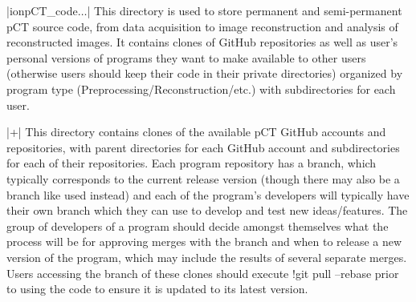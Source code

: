 \begin{tcbenvironment}
\begin{tcbparbox}|\dirsep ion\dirsep pCT\_code\dirsep $\dots$|
\bfdash This directory is used to store permanent and semi-permanent pCT source code, from data acquisition to image reconstruction and analysis of reconstructed images.  It contains clones of GitHub repositories as well as user's personal versions of programs they want to make available to other users (otherwise users should keep their code in their private directories) organized by program type (Preprocessing/Reconstruction/etc.) with subdirectories for each user.
\end{tcbparbox}
\begin{tcbparbox}|+|
\bfdash This directory contains clones of the available pCT GitHub accounts and repositories, with parent directories for each GitHub account and subdirectories for each of their repositories.  Each program repository has a  branch, which typically corresponds to the current release version (though there may also be a branch like  used instead) and each of the program's developers will typically have their own branch which they can use to develop and test new ideas/features.  The group of developers of a program should decide amongst themselves what the process will be for approving merges with the  branch and when to release a new version of the program, which may include the results of several separate merges.  Users accessing the  branch of these clones should execute \tcbinlinebashbox!{git pull --rebase} prior to using the code to ensure it is updated to its latest version.\\[\tcbparskip]


\end{tcbparbox}
\end{tcbenvironment}
